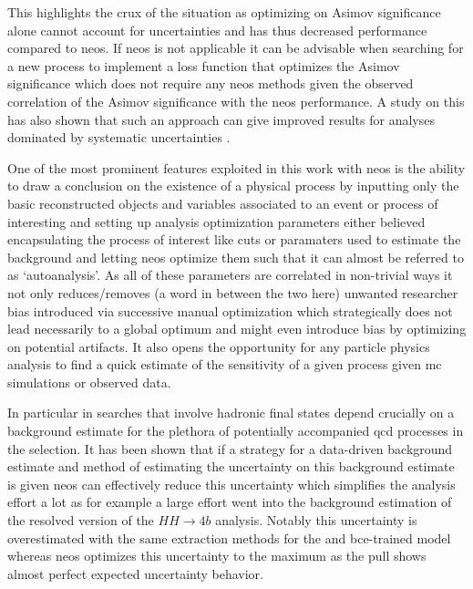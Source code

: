 This highlights the crux of the situation as optimizing on Asimov significance alone cannot account for uncertainties and has thus decreased performance compared to \ac{neos}. If \ac{neos} is not applicable it can be advisable when searching for a new process to implement a loss function that optimizes the Asimov significance which does not require any \ac{neos} methods given the observed correlation of the Asimov significance with the \ac{neos} performance. A study on this \citep{elwood2018direct} has also shown that such an approach can give improved results for analyses dominated by systematic uncertainties \citep{elwood2018direct}.

One of the most prominent features exploited in this work with \ac{neos} is the ability to draw a conclusion on the existence of a physical process by inputting only the basic reconstructed objects and variables associated to an event or process of interesting and setting up analysis optimization parameters either believed encapsulating the process of interest like cuts or paramaters used to estimate the background and letting neos optimize them such that it can almost be referred to as `autoanalysis'. As all of these parameters are correlated in non-trivial ways it not only reduces/removes (a word in between the two here) unwanted researcher bias introduced via successive manual optimization which strategically does not lead necessarily to a global optimum and might even introduce bias by optimizing on potential artifacts. It also opens the opportunity for any particle physics analysis to find a quick estimate of the sensitivity of a given process given \ac{mc} simulations or observed data.

In particular in searches that involve hadronic final states depend crucially on a background estimate for the plethora of potentially accompanied \ac{qcd} processes in the selection. It has been shown that if a strategy for a data-driven background estimate and method of estimating the uncertainty on this background estimate is given \ac{neos} can effectively reduce this uncertainty which simplifies the analysis effort a lot as for example a large effort went into the background estimation of the resolved version of the $HH\rightarrow 4b$ analysis. Notably this uncertainty is overestimated with the same extraction methods for the \mhh and \ac{bce}-trained model whereas \ac{neos} optimizes this uncertainty to the maximum as the pull shows almost perfect expected uncertainty behavior.



